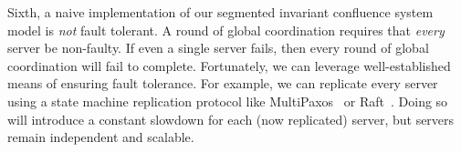 Sixth, a naive implementation of our segmented invariant confluence system
model is \emph{not} fault tolerant. A round of global coordination requires
that \emph{every} server be non-faulty. If even a single server fails, then
every round of global coordination will fail to complete. Fortunately, we can
leverage well-established means of ensuring fault tolerance. For example, we
can replicate every server using a state machine replication protocol like
MultiPaxos~\cite{lamport1998part, lamport2001paxos} or
Raft~\cite{ongaro2014search}. Doing so will introduce a constant slowdown for
each (now replicated) server, but servers remain independent and scalable.
